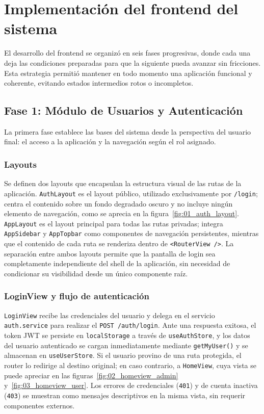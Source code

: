 \section{Implementación del frontend del sistema}

El desarrollo del frontend se organizó en seis fases progresivas, donde cada una 
deja las condiciones preparadas para que la siguiente pueda avanzar sin fricciones. 
Esta estrategia permitió mantener en todo momento una aplicación funcional y 
coherente, evitando estados intermedios rotos o incompletos.

\subsection{Fase 1: Módulo de Usuarios y Autenticación}\label{sec:hito4_frontend_fase_1}

La primera fase establece las bases del sistema desde la perspectiva del usuario 
final: el acceso a la aplicación y la navegación según el rol asignado.

\subsubsection*{Layouts}

Se definen dos layouts que encapsulan la estructura visual de las rutas de la 
aplicación. \texttt{AuthLayout} es el layout público, utilizado exclusivamente por 
\texttt{/login}; centra el contenido sobre un fondo degradado oscuro y no incluye 
ningún elemento de navegación, como se aprecia en la figura~\ref{fig:01_auth_layout}.
\texttt{AppLayout} es el layout principal para todas 
las rutas privadas; integra \texttt{AppSidebar} y \texttt{AppTopbar} como componentes 
de navegación persistentes, mientras que el contenido de cada ruta se renderiza 
dentro de \texttt{<RouterView />}. La separación entre ambos layouts permite que la 
pantalla de login sea completamente independiente del shell de la aplicación, sin 
necesidad de condicionar su visibilidad desde un único componente raíz.

\subsubsection*{LoginView y flujo de autenticación}

\texttt{LoginView} recibe las credenciales del usuario y delega en el servicio 
\texttt{auth.service} para realizar el \texttt{POST /auth/login}. Ante una respuesta 
exitosa, el token JWT se persiste en \texttt{localStorage} a través de 
\texttt{useAuthStore}, y los datos del usuario autenticado se cargan inmediatamente 
mediante \texttt{getMyUser()} y se almacenan en \texttt{useUserStore}. Si el usuario 
provino de una ruta protegida, el router lo redirige al destino original; en caso 
contrario, a \texttt{HomeView}, cuya vista se puede apreciar en las 
figuras~\ref{fig:02_homeview_admin} y~\ref{fig:03_homeview_user}.
Los errores de credenciales (\texttt{401}) y de 
cuenta inactiva (\texttt{403}) se muestran como mensajes descriptivos en la misma 
vista, sin requerir componentes externos.

